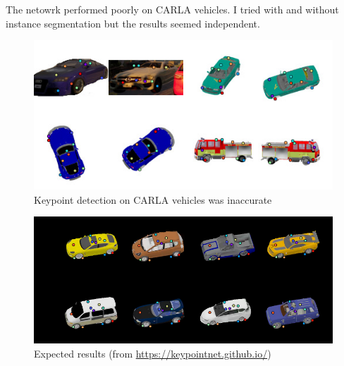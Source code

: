 The netowrk performed poorly on CARLA vehicles. I tried with and without
instance segmentation but the results seemed independent.

\begin{figure}[!ht]
	\centering
	\includegraphics[width=150mm, keepaspectratio]{figures/keypoints.jpg}
	\caption{Keypoint detection on CARLA vehicles was inaccurate}
	\label{fig:keypoints}
\end{figure}

\begin{figure}[!ht]
	\centering
	\includegraphics[width=150mm, keepaspectratio]{figures/keypointnet.png}
	\caption{Expected results (from \url{https://keypointnet.github.io/})}
	\label{fig:keypointnet}
\end{figure}